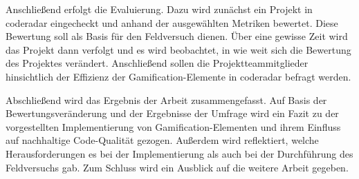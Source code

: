 \documentclass[fontsize=11pt, paper=a4, parskip=half]{scrartcl}
\begin{document}
Anschließend erfolgt die Evaluierung.
Dazu wird zunächst ein Projekt in coderadar eingecheckt und anhand der ausgewählten Metriken bewertet.
Diese Bewertung soll als Basis für den Feldversuch dienen.
Über eine gewisse Zeit wird das Projekt dann verfolgt und es wird beobachtet, in wie weit sich die Bewertung des Projektes verändert.
Anschließend sollen die Projektteammitglieder hinsichtlich der Effizienz der Gamification-Elemente in coderadar befragt werden.

Abschließend wird das Ergebnis der Arbeit zusammengefasst.
Auf Basis der Bewertungsveränderung und der Ergebnisse der Umfrage wird ein Fazit zu der vorgestellten Implementierung von Gamification-Elementen und ihrem Einfluss auf nachhaltige Code-Qualität gezogen.
Außerdem wird reflektiert, welche Herausforderungen es bei der Implementierung als auch bei der Durchführung des Feldversuchs gab.
Zum Schluss wird ein Ausblick auf die weitere Arbeit gegeben.

\pagebreak



\end{document}
